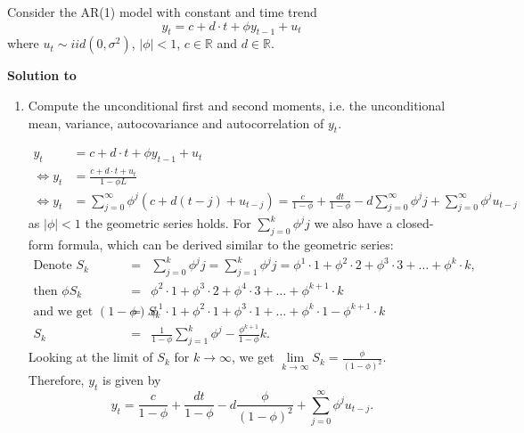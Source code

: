 Consider the AR(1) model with constant and time trend
$$ y_t = c + d\cdot t + \phi y_{t-1} + u_t$$
where $u_t \sim iid(0,\sigma^2)$, $|\phi|<1$, $c \in \mathbb{R}$ and $d \in \mathbb{R}$.

\begin{solution}\textbf{Solution to }\end{solution}

\begin{enumerate}
    \item Compute the unconditional first and second moments, i.e. the unconditional mean, variance, autocovariance and autocorrelation of $y_t$.
          \begin{solution}
              \begin{align*}
                  y_t                 & = c + d\cdot t + \phi y_{t-1} + u_t                                                                                                                     \\
                  \Leftrightarrow y_t & = \frac{c + d\cdot t + u_t}{1-\phi L}                                                                                                                   \\
                  \Leftrightarrow y_t & = \sum_{j=0}^{\infty}\phi^j(c+d(t-j)+u_{t-j}) = \frac{c}{1-\phi} + \frac{dt}{1-\phi} - d\sum_{j=0}^{\infty}\phi^j j + \sum_{j=0}^{\infty}\phi^j u_{t-j}
              \end{align*}
              as $|\phi| <1$ the geometric series holds. For $\sum_{j=0}^{k} \phi^j j$ we also have a closed-form formula, which can be derived similar to the geometric series:
              \begin{eqnarray*}
                  \text{Denote } S_{k}
                  &=&	\sum_{j=0}^{k} \phi^j j = \sum_{j=1}^{k} \phi^j j
                  =	\phi^1 \cdot 1 + \phi^2 \cdot 2+ \phi^3 \cdot 3 + \dots +
                  \phi^k \cdot k, \\
                  \text{then } \phi S_{k}
                  &=& \phi^2 \cdot 1 + \phi^3 \cdot 2+ \phi^4 \cdot 3 + \dots +
                  \phi^{k+1} \cdot k \\
                  \text{and we get } (1 - \phi) S_{k}
                  &=& \phi^1 \cdot 1+ \phi^2 \cdot 1 + \phi^3 \cdot 1 + \dots + \phi^{k} \cdot 1 - \phi^{k+1} \cdot k \\
                  S_{k}	&=& \frac{1}{1 - \phi} \sum_{j = 1}^{k} \phi^j - \frac{\phi^{k+1}}{1 - \phi} k.
              \end{eqnarray*}
              Looking at the limit of $S_{k}$ for $k \to \infty$, we get
              $\lim\limits_{k \to \infty} S_{k} = \frac{\phi}{(1 - \phi)^2}$. \\
              Therefore, $y_{t}$ is given by
              \begin{displaymath}
                  y_{t} = \frac{c}{1-\phi} + \frac{dt}{1-\phi} - d \frac{\phi}{(1 - \phi)^2}  + \sum_{j=0}^{\infty} \phi^j u_{t-j}.
              \end{displaymath}


\end{solution}
\end{enumerate}
